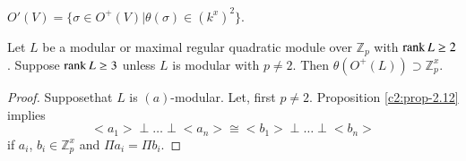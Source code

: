 \begin{defi*}
$O'(V)=\{\sigma\in O^{+}(V)|\theta(\sigma)\in (k^{x})^{2}\}$.
\end{defi*}

\setcounter{prop}{17}
\begin{prop}\label{c2:prop-2.18}
Let $L$ be a modular or maximal regular quadratic module over
$\mathbb{Z}_{p}$ with $\operatorname{rank} L\geq 2$. Suppose $\operatorname{rank} L\geq 3$ unless
$L$ is modular with $p\neq 2$. Then $\theta(O^{+}(L))\supset
\mathbb{Z}^{x}_{p}$. 
\end{prop}

\begin{proof}
Suppose\pageoriginale that $L$ is $(a)$-modular. Let, first $p\neq
2$. Proposition \ref{c2:prop-2.12} implies
$$
<a_{1}>\perp\ldots\perp <a_{n}>\cong <b_{1}>\perp\ldots\perp <b_{n}>
$$
if $a_{i}$, $b_{i}\in\mathbb{Z}^{x}_{p}$ and $\Pi a_{i}=\Pi b_{i}$.


\end{proof}
